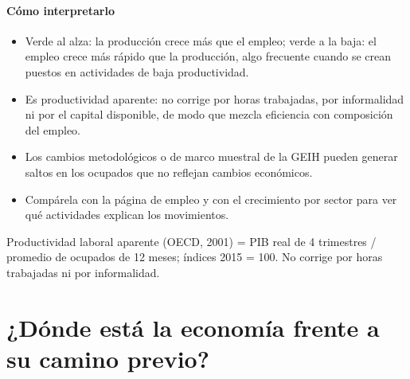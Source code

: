 \paragraph{Cómo interpretarlo}
\begin{itemize}
\item Verde al alza: la producción crece más que el empleo; verde a la baja: el empleo crece más rápido que la producción, algo frecuente cuando se crean puestos en actividades de baja productividad.
\item Es productividad aparente: no corrige por horas trabajadas, por informalidad ni por el capital disponible, de modo que mezcla eficiencia con composición del empleo.
\item Los cambios metodológicos o de marco muestral de la GEIH pueden generar saltos en los ocupados que no reflejan cambios económicos.
\item Compárela con la página de empleo y con el crecimiento por sector para ver qué actividades explican los movimientos.
\end{itemize}
\begin{formulas}[Fórmulas]
\end{formulas}
\begin{metodo}[Metodología]
Productividad laboral aparente (OECD, 2001) = PIB real de 4 trimestres / promedio de ocupados de 12 meses; índices 2015 = 100. No corrige por horas trabajadas ni por informalidad.
\par{}
\end{metodo}

\section{¿Dónde está la economía frente a su camino previo?}

